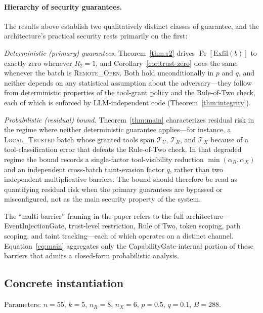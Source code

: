 \documentclass[pdflatex,sn-nature]{sn-jnl}%
\theoremstyle{thmstyleone}%
\theoremstyle{thmstyletwo}%
\theoremstyle{thmstylethree}%
\begin{document}
\paragraph{Hierarchy of security guarantees.} The results above establish two qualitatively distinct classes of guarantee, and the architecture's practical security rests primarily on the first:

\emph{Deterministic (primary) guarantees.} Theorem~\ref{thm:r2} drives $\Pr[\text{Exfil}(b)]$ to exactly zero whenever $R_2 = 1$, and Corollary~\ref{cor:trust-zero} does the same whenever the batch is \textsc{Remote\_Open}. Both hold unconditionally in $p$ and $q$, and neither depends on any statistical assumption about the adversary---they follow from deterministic properties of the tool-grant policy and the Rule-of-Two check, each of which is enforced by LLM-independent code (Theorem~\ref{thm:integrity}).

\emph{Probabilistic (residual) bound.} Theorem~\ref{thm:main} characterizes residual risk in the regime where neither deterministic guarantee applies---for instance, a \textsc{Local\_Trusted} batch whose granted tools span $\mathcal{T}_U$, $\mathcal{T}_R$, and $\mathcal{T}_X$ because of a tool-classification error that defeats the Rule-of-Two check. In that degraded regime the bound records a single-factor tool-visibility reduction $\min(\alpha_R, \alpha_X)$ and an independent cross-batch taint-evasion factor $q$, rather than two independent multiplicative barriers. The bound should therefore be read as quantifying residual risk when the primary guarantees are bypassed or misconfigured, not as the main security property of the system.

The ``multi-barrier'' framing in the paper refers to the full architecture---EventInjectionGate, trust-level restriction, Rule of Two, token scoping, path scoping, and taint tracking---each of which operates on a distinct channel. Equation~\eqref{eq:main} aggregates only the CapabilityGate-internal portion of these barriers that admits a closed-form probabilistic analysis.

\subsection{Concrete instantiation}\label{subsec:instantiation}

Parameters: $n = 55$, $k = 5$, $n_R = 8$, $n_X = 6$, $p = 0.5$, $q = 0.1$, $B = 288$.
\end{document}
